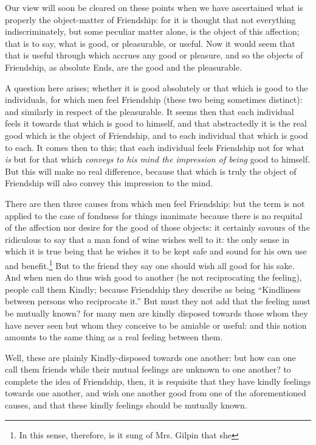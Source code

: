 
Our view will soon be cleared on these points when we have ascertained what is
properly the object-matter of Friendship: for it is thought that not everything
indiscriminately, but some peculiar matter alone, is the object of this
affection; that is to say, what is good, or pleasurable, or useful. Now it
would seem that that is useful through which accrues any good or pleasure, and
so the objects of Friendship, as absolute Ends, are the good and the
pleasurable.

A question here arises; whether it is good absolutely or that which is good to
the individuals, for which men feel Friendship (these two being sometimes
distinct): and similarly in respect of the pleasurable. It seems then that each
individual feels it towards that which is good to himself, and that
abstractedly it is the real good which is the object of Friendship, and to each
individual that which is good to each. It comes then to this; that each
individual feels Friendship not for what \emph{is} but for that which
\emph{conveys to his mind the impression of being} good to himself. But this
will make no real difference, because that which is truly the object of
Friendship will also convey this impression to the mind.

There are then three causes from which men feel Friendship: but the term is not
applied to the case of fondness for things inanimate because there is no
requital of the affection nor desire for the good of those objects: it
certainly savours of the ridiculous to say that a man fond of wine wishes well
to it: the only sense in which it is true being that he wishes it to be kept
safe and sound for his own use and benefit.\footnote{In this sense, therefore, is it sung of Mrs. Gilpin that she}
But to the friend they say one should wish all good for his sake. And when men
do thus wish good to another (he not reciprocating the feeling), people call
them Kindly; because Friendship they describe as being “Kindliness
between persons who reciprocate it.” But must they not add that the
feeling must be mutually known? for many men are kindly disposed towards those
whom they have never seen but whom they conceive to be amiable or useful: and
this notion amounts to the same thing as a real feeling between them.

Well, these are plainly Kindly-disposed towards one another: but how can one
call them friends while their mutual feelings are unknown to one another? to
complete the idea of Friendship, then, it is requisite that they have kindly
feelings towards one another, and wish one another good from one of the
aforementioned causes, and that these kindly feelings should be mutually known.

